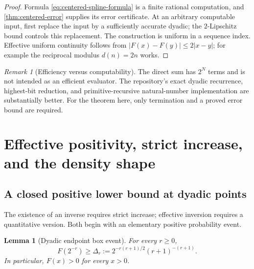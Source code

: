 \documentclass[11pt,oneside]{article}
\newtheorem{lemma}[theorem]{Lemma}
\theoremstyle{definition}
\theoremstyle{remark}
\newtheorem{remark}[theorem]{Remark}
\numberwithin{equation}{section}
\begin{document}
\begin{proof}
Formula \eqref{eq:centered-spline-formula} is a finite rational computation,
and \cref{thm:centered-error} supplies its error certificate.  At an arbitrary
computable input, first replace the input by a sufficiently accurate dyadic;
the $2$-Lipschitz bound controls this replacement.  The construction is
uniform in a sequence index.  Effective uniform continuity follows from
$|F(x)-F(y)|\le2|x-y|$; for example the reciprocal modulus $d(n)=2n$ works.
\end{proof}

\begin{remark}[Efficiency versus computability]
The direct sum has $2^N$ terms and is not intended as an efficient evaluator.
The repository's exact dyadic recurrence, highest-bit reduction, and
primitive-recursive natural-number implementation are substantially better.
For the theorem here, only termination and a proved error bound are required.
\end{remark}

\section{Effective positivity, strict increase, and the density shape}

\subsection{A closed positive lower bound at dyadic points}

The existence of an inverse requires strict increase; effective inversion
requires a quantitative version.  Both begin with an elementary positive
probability event.

\begin{lemma}[Dyadic endpoint box event]\label{lem:box-event}
For every $r\ge0$,
\begin{equation}\label{eq:Delta-def}
 F(2^{-r})\ge
 \Delta_r:=2^{-r(r+1)/2}(r+1)^{-(r+1)}.
\end{equation}
In particular, $F(x)>0$ for every $x>0$.
\end{lemma}
\end{document}
